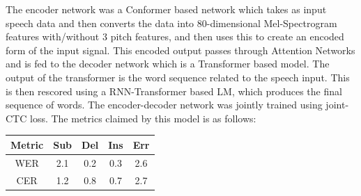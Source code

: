 \documentclass[14pt,a4paper]{article}
\begin{document}
The encoder network was a Conformer based network which takes as input speech data and then converts the data into 80-dimensional Mel-Spectrogram features with/without 3 pitch features, and then uses this to create an encoded form of the input signal. This encoded output passes through Attention Networks and is fed to the decoder network which is a Transformer based model. The output of the transformer is the word sequence related to the speech input. This is then rescored using a RNN-Transformer based LM, which produces the final sequence of words. The encoder-decoder network was jointly trained using joint-CTC loss. The metrics claimed by this model is as follows:
\begin{center}
	\begin{tabular}{|c|c|c|c|c|}
	\hline
	Metric & Sub & Del & Ins & Err \\
	\hline
	WER & 2.1 & 0.2 & 0.3 & 2.6 \\
	CER & 1.2 & 0.8 & 0.7 & 2.7 \\
	\hline
	\end{tabular}
\end{center}
\end{document}
